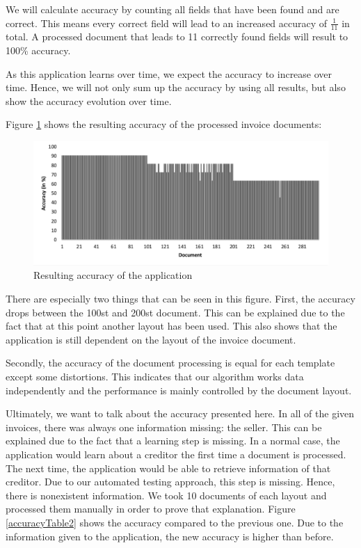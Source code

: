 We will calculate accuracy by counting all fields that have been found and are correct. This means every correct field will lead to an increased accuracy of $\frac{1}{11}$ in total. A processed document that leads to 11 correctly found fields will result to 100\% accuracy. 

As this application learns over time, we expect the accuracy to increase over time. Hence, we will not only sum up the accuracy by using all results, but also show the accuracy evolution over time.

Figure \ref{accuracyTable} shows the resulting accuracy of the processed invoice documents: 
\begin{figure}[ht!]
\centering
\includegraphics[width=\textwidth,natwidth=260,natheight=109]{Images/Accuracy/Values.pdf}
\caption{Resulting accuracy of the application \label{accuracyTable}}
\end{figure}

There are especially two things that can be seen in this figure. First, the accuracy drops between the 100st and 200st document. This can be explained due to the fact that at this point another layout has been used. This also shows that the application is still dependent on the layout of the invoice document.

Secondly, the accuracy of the document processing is equal for each template except some distortions. This indicates that our algorithm works data independently and the performance is mainly controlled by the document layout.

Ultimately, we want to talk about the accuracy presented here. In all of the given invoices, there was always one information missing: the seller. This can be explained due to the fact that a learning step is missing. In a normal case, the application would learn about a creditor the first time a document is processed. The next time, the application would be able to retrieve information of that creditor. Due to our automated testing approach, this step is missing. Hence, there is nonexistent information.
We took 10 documents of each layout and processed them manually in order to prove that explanation. Figure \ref{accuracyTable2} shows the accuracy compared to the previous one. Due to the information given to the application, the new accuracy is higher than before.

